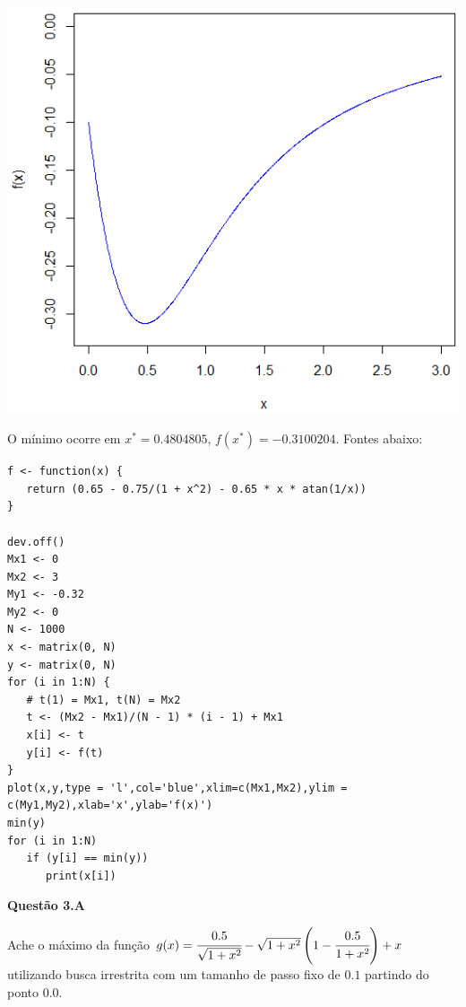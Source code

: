 \documentclass{rbfin}
\begin{document}
\begin{center}
\includegraphics[scale=0.666]{q2}
\end{center}

O mínimo ocorre em $x^* = 0.4804805$, $f(x^*) = -0.3100204$. Fontes abaixo:

\singlespacing

\begin{verbatim}
f <- function(x) {
   return (0.65 - 0.75/(1 + x^2) - 0.65 * x * atan(1/x))
}
   
dev.off()
Mx1 <- 0
Mx2 <- 3
My1 <- -0.32
My2 <- 0
N <- 1000
x <- matrix(0, N)
y <- matrix(0, N)
for (i in 1:N) {
   # t(1) = Mx1, t(N) = Mx2
   t <- (Mx2 - Mx1)/(N - 1) * (i - 1) + Mx1 
   x[i] <- t
   y[i] <- f(t)
}
plot(x,y,type = 'l',col='blue',xlim=c(Mx1,Mx2),ylim = c(My1,My2),xlab='x',ylab='f(x)')
min(y)
for (i in 1:N)
   if (y[i] == min(y))
      print(x[i])
\end{verbatim}

\vspace{6mm}

\large

\textbf{Questão 3.A}

\normalsize

\vspace{6mm}

\doublespacing

Ache o máximo da função $g(x) = \cfrac{0.5}{\sqrt{1 + x^2}} - \sqrt{1 + x^2} \left( 1 - \cfrac{0.5}{1 + x^2} \right) + x$ utilizando busca irrestrita com um tamanho de passo fixo de $0.1$ partindo do ponto $0.0$.
\end{document}
